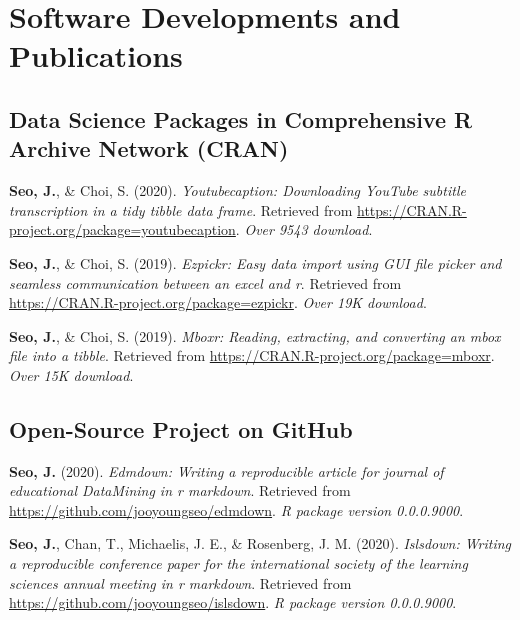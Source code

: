 \documentclass[11pt,a4paper,]{awesome-cv}
\begin{document}
\hypertarget{software-developments-and-publications}{%
    \section{Software Developments and
      Publications}\label{software-developments-and-publications}}

\hypertarget{data-science-packages-in-comprehensive-r-archive-network-cran}{%
    \subsection{Data Science Packages in Comprehensive R Archive Network
        (CRAN)}\label{data-science-packages-in-comprehensive-r-archive-network-cran}}

\hypertarget{refs_R_packages}{}
\leavevmode{}%
\textbf{Seo, J.}, \& Choi, S. (2020). \emph{Youtubecaption: Downloading
    YouTube subtitle transcription in a tidy tibble data frame}. Retrieved
from \url{https://CRAN.R-project.org/package=youtubecaption}. \emph{Over
    9543 download}.

\leavevmode{}%
\textbf{Seo, J.}, \& Choi, S. (2019). \emph{Ezpickr: Easy data import
    using GUI file picker and seamless communication between an excel and
    r}. Retrieved from \url{https://CRAN.R-project.org/package=ezpickr}.
\emph{Over 19K download}.

\leavevmode{}%
\textbf{Seo, J.}, \& Choi, S. (2019). \emph{Mboxr: Reading, extracting,
    and converting an mbox file into a tibble}. Retrieved from
\url{https://CRAN.R-project.org/package=mboxr}. \emph{Over 15K
    download}.

\newpage

\hypertarget{open-source-project-on-github}{%
    \subsection{Open-Source Project on
        GitHub}\label{open-source-project-on-github}}

\hypertarget{refs_github_projects}{}
\leavevmode{}%
\textbf{Seo, J.} (2020). \emph{Edmdown: Writing a reproducible article
    for journal of educational DataMining in r markdown}. Retrieved from
\url{https://github.com/jooyoungseo/edmdown}. \emph{R package version
    0.0.0.9000}.

\leavevmode{}%
\textbf{Seo, J.}, Chan, T., Michaelis, J. E., \& Rosenberg, J. M.
(2020). \emph{Islsdown: Writing a reproducible conference paper for the
    international society of the learning sciences annual meeting in r
    markdown}. Retrieved from \url{https://github.com/jooyoungseo/islsdown}.
\emph{R package version 0.0.0.9000}.
\end{document}
